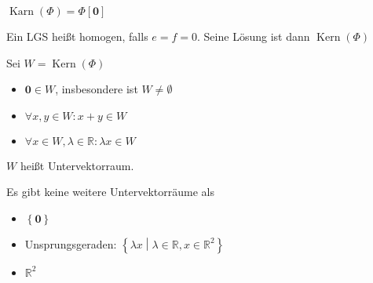 \begin{definition}
  $\operatorname{Karn}(\Phi) = \Phi[\mathbf{0}]$

  Ein LGS heißt homogen, falls $e = f = 0$. Seine Lösung ist dann $\operatorname{Kern}(\Phi)$
\end{definition}
\begin{proposition}
  Sei $W = \operatorname{Kern}(\Phi)$
  \begin{itemize}
  \item $\mathbf{0} \in W$, insbesondere ist $W \ne \emptyset$
  \item $\forall x, y \in W: x+y \in W$
  \item $\forall x \in W, \lambda \in \mathbb{R}: \lambda x \in W$
  \end{itemize}
  $W$ heißt Untervektorraum.
\end{proposition}
\begin{theorem}
  Es gibt keine weitere Untervektorräume als
  \begin{itemize}
  \item $\left\{ \mathbf{0} \right\}$
  \item Unsprungsgeraden: $\left\{ \lambda x \middle| \lambda \in \mathbb{R}, x \in \mathbb{R}^2 \right\}$
  \item $\mathbb{R}^2$
  \end{itemize}
\end{theorem}